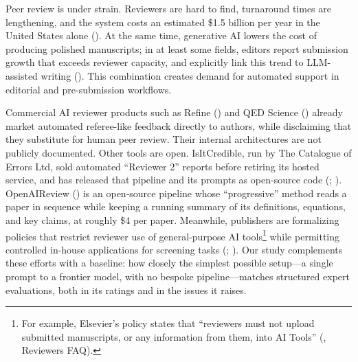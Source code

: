 \documentclass[
  11pt,
  letterpaper,
]{article}
\begin{document}
Peer review is under strain. Reviewers are hard to find, turnaround
times are lengthening, and the system costs an estimated \$1.5 billion
per year in the United States alone
(). At
the same time, generative AI lowers the cost of producing polished
manuscripts; in at least some fields, editors report submission growth
that exceeds reviewer capacity, and explicitly link this trend to
LLM-assisted writing (). This combination creates demand for automated support in
editorial and pre-submission workflows.

Commercial AI reviewer products such as Refine
() and QED Science
() already market
automated referee-like feedback directly to authors, while disclaiming
that they substitute for human peer review. Their internal architectures
are not publicly documented. Other tools are open. IsItCredible, run by
The Catalogue of Errors Ltd, sold automated ``Reviewer 2'' reports
before retiring its hosted service, and has released that pipeline and
its prompts as open-source code
(;
). OpenAIReview
() is an open-source
pipeline whose ``progressive'' method reads a paper in sequence while
keeping a running summary of its definitions, equations, and key claims,
at roughly \$4 per paper. Meanwhile, publishers are formalizing policies
that restrict reviewer use of general-purpose AI tools\footnote{For
  example, Elsevier's policy states that ``reviewers must not upload
  submitted manuscripts, or any information from them, into AI Tools''
  (, Reviewers FAQ).}
while permitting controlled in-house applications for screening tasks
(;
). Our study
complements these efforts with a baseline: how closely the simplest
possible setup---a single prompt to a frontier model, with no bespoke
pipeline---matches structured expert evaluations, both in its ratings
and in the issues it raises.
\end{document}

